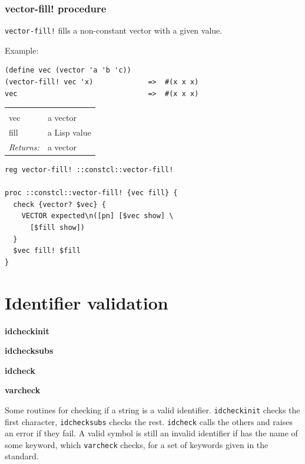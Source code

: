 \documentclass[twoside,9pt]{report}
\begin{document}
\subsection{vector-fill! procedure}
\label{vector-fill"!-procedure}


\texttt{vector-fill!} fills a non-constant vector with a given value.



Example:

\begin{verbatim}
(define vec (vector 'a 'b 'c))
(vector-fill! vec 'x)             =>  #(x x x)
vec                               =>  #(x x x)
\end{verbatim}
\noindent\begin{tabular}{ |p{1.5cm} p{8cm}| }
\hline
\rowcolor[HTML]{CCCCCC} \multicolumn{2}{|l|}{\bf vector-fill! (public)} \\
vec & a vector \\
fill & a Lisp value \\
\textit{Returns:} & a vector \\
\hline
\end{tabular}
\begin{lstlisting}
reg vector-fill! ::constcl::vector-fill!
 
proc ::constcl::vector-fill! {vec fill} {
  check {vector? $vec} {
    VECTOR expected\n([pn] [$vec show] \
      [$fill show])
  }
  $vec fill! $fill
}
\end{lstlisting}
\chapter{Identifier validation}
\label{identifier-validation}


\textbf{idcheckinit}


\textbf{idchecksubs}


\textbf{idcheck}


\textbf{varcheck}


Some routines for checking if a string is a valid identifier. \texttt{idcheckinit} checks the first character, \texttt{idchecksubs} checks the rest. \texttt{idcheck} calls the others and raises an error if they fail. A valid symbol is still an invalid identifier if has the name of some keyword, which \texttt{varcheck} checks, for a set of keywords given in the standard.
\end{document}
